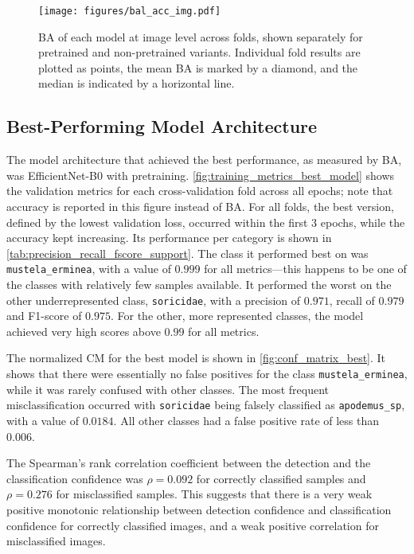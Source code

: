 \begin{figure}[ht]
\centering
\texttt{[image: figures/bal\_acc\_img.pdf]}
\caption{
    \acs{BA} of each model at image level across folds, shown separately for pretrained and non-pretrained variants.
    Individual fold results are plotted as points, the mean \acs{BA} is marked by a diamond, and the median is indicated by a horizontal line.
    }
\label{fig:bal_acc_img}
\end{figure}

\subsection{Best-Performing Model Architecture}
The model architecture that achieved the best performance, as measured by \ac{BA}, was EfficientNet-B0 with pretraining.
\autoref{fig:training_metrics_best_model} shows the validation metrics for each cross-validation fold across all epochs; note that accuracy is reported in this figure instead of \ac{BA}.
For all folds, the best version, defined by the lowest validation loss, occurred within the first 3 epochs, while the accuracy kept increasing.
Its performance per category is shown in \autoref{tab:precision_recall_fscore_support}.
The class it performed best on was \texttt{mustela\_erminea}, with a value of \(0.999\) for all metrics---this happens to be one of the classes with relatively few samples available.
It performed the worst on the other underrepresented class, \texttt{soricidae}, with a precision of \(0.971\), recall of \(0.979\) and F1-score of \(0.975\).
For the other, more represented classes, the model achieved very high scores above \(0.99\) for all metrics.

The normalized \ac{CM} for the best model is shown in \autoref{fig:conf_matrix_best}.
It shows that there were essentially no false positives for the class \texttt{mustela\_erminea}, while it was rarely confused with other classes.
The most frequent misclassification occurred with \texttt{soricidae} being falsely classified as \texttt{apodemus\_sp}, with a value of \(0.0184\).
All other classes had a false positive rate of less than \(0.006\).

The Spearman's rank correlation coefficient between the detection and the classification confidence was $\rho = 0.092$ for correctly classified samples and $\rho = 0.276$ for misclassified samples.
This suggests that there is a very weak positive monotonic relationship between detection confidence and classification confidence for correctly classified images, and a weak positive correlation for misclassified images.

